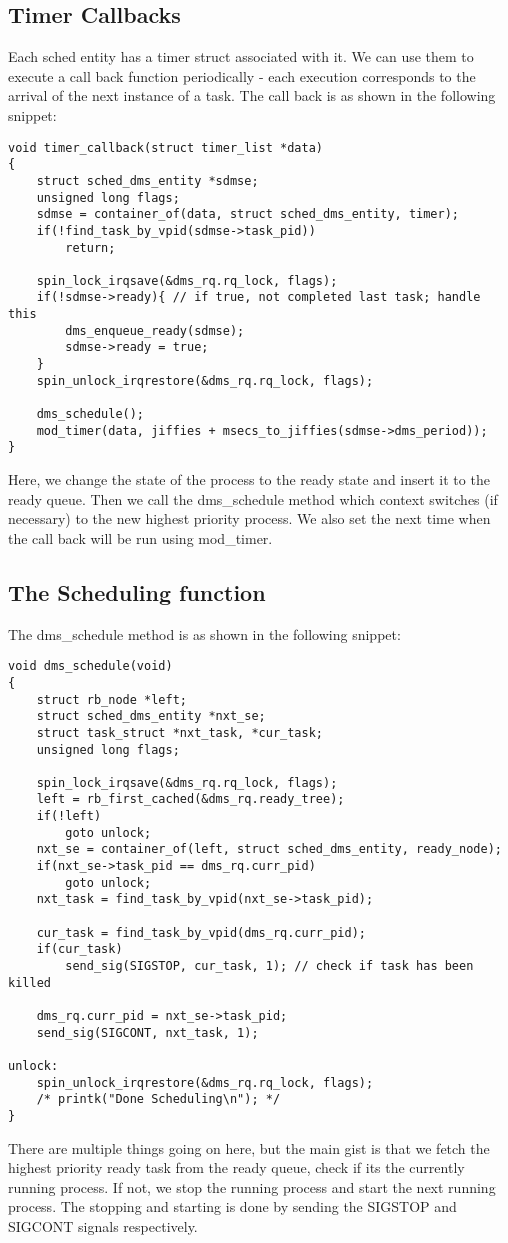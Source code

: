 \documentclass[12pt, letterpaper]{article}
\begin{document}
\subsection{Timer Callbacks}
Each sched entity has a timer struct associated with it. We can use them to 
execute a call back function periodically - each execution corresponds to the arrival of the next instance of a task. The call back is as shown in the following snippet:

\begin{lstlisting}
void timer_callback(struct timer_list *data)
{
    struct sched_dms_entity *sdmse;
    unsigned long flags;
    sdmse = container_of(data, struct sched_dms_entity, timer);
    if(!find_task_by_vpid(sdmse->task_pid))
        return;
        
    spin_lock_irqsave(&dms_rq.rq_lock, flags);
    if(!sdmse->ready){ // if true, not completed last task; handle this
        dms_enqueue_ready(sdmse);
        sdmse->ready = true;
    }
    spin_unlock_irqrestore(&dms_rq.rq_lock, flags);

    dms_schedule();
    mod_timer(data, jiffies + msecs_to_jiffies(sdmse->dms_period));
}
\end{lstlisting}
Here, we change the state of the process to the ready state and insert it to the ready queue. Then we call the {\ttfamily dms\_schedule} method which context switches (if necessary) to the new highest priority
process. We also set the next time when the call back will be run using {\ttfamily mod\_timer}.

\subsection{The Scheduling function}
The {\ttfamily dms\_schedule} method is as shown in the following snippet: 

\begin{lstlisting}
void dms_schedule(void)
{
	struct rb_node *left; 
    struct sched_dms_entity *nxt_se;
    struct task_struct *nxt_task, *cur_task;
    unsigned long flags;

    spin_lock_irqsave(&dms_rq.rq_lock, flags);
    left = rb_first_cached(&dms_rq.ready_tree);
    if(!left)
        goto unlock;
    nxt_se = container_of(left, struct sched_dms_entity, ready_node);
    if(nxt_se->task_pid == dms_rq.curr_pid)
        goto unlock;
    nxt_task = find_task_by_vpid(nxt_se->task_pid);

    cur_task = find_task_by_vpid(dms_rq.curr_pid);
    if(cur_task)
        send_sig(SIGSTOP, cur_task, 1); // check if task has been killed

    dms_rq.curr_pid = nxt_se->task_pid;
    send_sig(SIGCONT, nxt_task, 1);

unlock:
    spin_unlock_irqrestore(&dms_rq.rq_lock, flags);
    /* printk("Done Scheduling\n"); */
}
\end{lstlisting}
There are multiple things going on here, but the main gist is that we fetch the highest priority ready task from the ready queue, check if its the currently running process. If not, we stop the running process 
and start the next running process. The stopping and starting  is done by sending the SIGSTOP and SIGCONT signals respectively.
\end{document}
